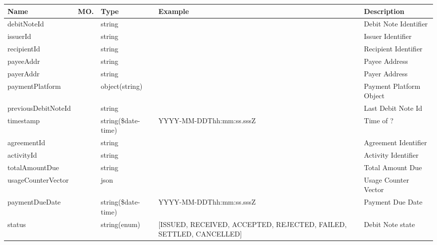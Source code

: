 \begin{enumerate}
\begin{table}[H]
\footnotesize

\begin{center}
\begin{tabular}{|p{3cm}|l|p{3cm}|p{3cm}|p{4cm}|} 
\hline
\rowcolor{lightgray}	Name	& MO.	& Type	& Example & 	Description \\
\hline

debitNoteId				&	&	string				&																		&	Debit Note Identifier \\
\hline   

issuerId				&	&	string				&																		&	Issuer Identifier \\
\hline   
  
recipientId				&	&	string				&																		&	Recipient Identifier \\
\hline   

payeeAddr				&	&	string				&																		&	Payee Address \\
\hline   
  
payerAddr				&	&	string				&																		&	Payer Address \\
\hline
   
paymentPlatform			&	&	object(string)		&																		&	Payment Platform Object \\
\hline

previousDebitNoteId		&	&	string				&																		& 	Last Debit Note Id \\
\hline

timestamp				&   &	string(\$date-time)	&	YYYY-MM-DDThh:mm:ss.sssZ											&	Time of ? \\
\hline

agreementId				& 	& 	string				&																		&	Agreement Identifier \\ 
\hline

activityId				& 	& 	string				&																		&	Activity Identifier \\ 
\hline

totalAmountDue			& 	& 	string				&																		&	Total Amount Due \\ 
\hline

usageCounterVector		&   & 	json				&																		&	Usage Counter Vector \\
\hline

paymentDueDate			&   &	string(\$date-time)	&	YYYY-MM-DDThh:mm:ss.sssZ											&	Payment Due Date \\
\hline

status					&	&	string(enum)		&	[ISSUED, RECEIVED, ACCEPTED, REJECTED, FAILED, SETTLED, CANCELLED]	& 	Debit Note state \\	
\hline


\end{tabular}
\end{center}
\end{table}
\end{enumerate}
